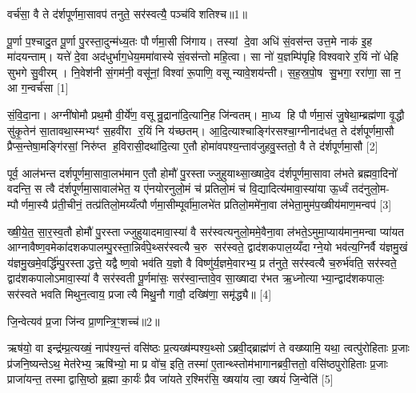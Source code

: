 {\scriptsize {वर्च॑सा॒ वै ते द॑र्\mbox{}शपूर्णमा॒सावप॑ तनुते॒ सर॑स्वत्यै॒ पञ्च॑विशतिश्च॥1॥}}

पू॒र्णा प॒श्चादु॒त पू॒र्णा पु॒रस्ता॒दुन्म॑ध्य॒तः पौर्णमा॒सी जि॑गाय। तस्यां दे॒वा अधि॑ सं॒वस॑न्त उत्त॒मे नाक॑ इ॒ह मा॑दयन्ताम्। यत्ते॑ दे॒वा अद॑धुर्भाग॒धेय॒ममा॑वास्ये सं॒वस॑न्तो महि॒त्वा। सा नो॑ य॒ज्ञम्पि॑पृहि विश्ववारे र॒यिं नो॑ धेहि सुभगे सु॒वीरम्। नि॒वेश॑नी सं॒गम॑नी॒ वसू॑नां॒ विश्वा॑ रू॒पाणि॒ वसून्यावे॒शय॑न्ती। स॒ह॒स्र॒पो॒ष सु॒भगा॒ ररा॑णा॒ सा न॒ आ ग॒न्वर्च॑सा [1]

सं॒वि॒दा॒ना। अग्नी॑षोमौ प्रथ॒मौ वी॒र्ये॑ण॒ वसून्रु॒द्राना॑दि॒त्यानि॒ह जि॑न्वतम्। मा॒ध्य हि पौर्णमा॒सं जु॒षेथा॒म्ब्रह्म॑णा वृ॒द्धौ सु॑कृ॒तेन॑ सा॒तावथा॒स्मभ्यꣳ॑ स॒हवी॑रा र॒यिं नि य॑च्छतम्। आ॒दि॒त्याश्चाङ्गि॑रसश्चा॒ग्नीनाद॑धत॒ ते द॑र्\mbox{}शपूर्णमा॒सौ प्रैप्स॒न्तेषा॒मङ्गि॑रसां॒ निरु॑प्त ह॒विरासी॒दथा॑दि॒त्या ए॒तौ होमा॑वपश्य॒न्ताव॑जुहवु॒स्ततो॒ वै ते द॑र्\mbox{}शपूर्णमा॒सौ [2]

पूर्व॒ आल॑भन्त दर्\mbox{}शपूर्णमा॒सावा॒लभ॑मान ए॒तौ होमौ॑ पु॒रस्ताज्जुहुयाथ्सा॒ख्षादे॒व द॑र्\mbox{}शपूर्णमा॒सावा ल॑भते ब्रह्मवा॒दिनो॑ वदन्ति॒ स त्वै द॑र्\mbox{}शपूर्णमा॒सावाल॑भेत॒ य ए॑नयोरनुलो॒मं च॑ प्रतिलो॒मं च॑ वि॒द्यादित्य॑मावा॒स्या॑या ऊ॒र्ध्वं तद॑नुलो॒म- म्पौर्णमा॒स्यै प्र॑ती॒चीनं॒ तत्प्र॑तिलो॒मय्यँत्पौर्णमा॒सीम्पूर्वा॑मा॒लभे॑त प्रतिलो॒ममे॑ना॒वा ल॑भेता॒मुम॑प॒ख्षीय॑माण॒मन्वप॑ [3]

ख्षी॒ये॒त॒ सा॒र॒स्व॒तौ होमौ॑ पु॒रस्ताज्जुहुयादमावा॒स्या॑ वै सर॑स्वत्यनुलो॒ममे॒वैना॒वा ल॑भते॒ऽमुमा॒प्याय॑मान॒मन्वा प्या॑यत आग्नावैष्ण॒वमेका॑दशकपालम्पु॒रस्ता॒न्निर्व॑पे॒थ्सर॑स्वत्यै च॒रु सर॑स्वते॒ द्वाद॑शकपाल॒य्यँदाग्ने॒यो भव॑त्य॒ग्निर्वै य॑ज्ञमु॒खं य॑ज्ञमु॒खमे॒वर्द्धि॑म्पु॒रस्ताद्धत्ते॒ यद्वैष्ण॒वो भव॑ति य॒ज्ञो वै विष्णु॑र्य॒ज्ञमे॒वारभ्य॒ प्र त॑नुते॒ सर॑स्वत्यै च॒रुर्भ॑वति॒ सर॑स्वते॒ द्वाद॑शकपालोऽमावा॒स्या॑ वै सर॑स्वती पू॒र्णमा॑सः॒ सर॑स्वा॒न्तावे॒व सा॒ख्षादा र॑भत ऋ॒ध्नोत्याभ्या॒न्द्वाद॑शकपालः॒ सर॑स्वते भवति मिथुन॒त्वाय॒ प्रजात्यै मिथु॒नौ गावौ॒ दख्षि॑णा॒ समृ॑द्ध्यै॥ [4]

{\scriptsize {जि॒न्वेत्यव॑ प्र॒जा जि॑न्व प्रा॒णन्त्रि॒ꣳ॒शच्च॑॥2॥}}

ऋष॑यो॒ वा इन्द्र॑म्प्र॒त्यख्षं॒ नाप॑श्य॒न्तं वसि॑ष्ठः प्र॒त्यख्ष॑म्पश्य॒थ्सोऽब्रवी॒द्ब्राह्म॑णं ते वख्ष्यामि॒ यथा॒ त्वत्पु॑रोहिताः प्र॒जाः प्र॑जनि॒ष्यन्तेऽथ॒ मेत॑रेभ्य॒ ऋषि॑भ्यो॒ मा प्र वो॑च॒ इति॒ तस्मा॑ ए॒तान्थ्स्तोम॑भागानब्रवी॒त्ततो॒ वसि॑ष्ठपुरोहिताः प्र॒जाः प्राजा॑यन्त॒ तस्माद्वासि॒ष्ठो ब्र॒ह्मा का॒र्यः॑ प्रैव जा॑यते र॒श्मिर॑सि॒ ख्षया॑य त्वा॒ ख्षयं॑ जि॒न्वेति॑ [5]

